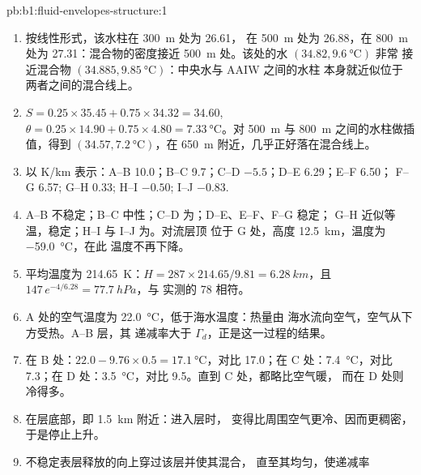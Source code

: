 \begin{solution}{pb:b1:fluid-envelopes-structure:1}
\begin{enumerate}
        为 26.888，比其平均值大 \qty{0.14}{kg.m^{-3}}。这就是混合增密效应。
  \item 按线性形式，该水柱在 \qty{300}{m} 处为 26.61，
        在 \qty{500}{m} 处为 26.88，在 \qty{800}{m} 处为 27.31：混合物的密度接近
        \qty{500}{m} 处。该处的水 $(34.82, \qty{9.6}{\celsius})$ 非常
        接近混合物 $(34.885, \qty{9.85}{\celsius})$：中央水与 AAIW 之间的水柱
        本身就近似位于
        两者之间的混合线上。
  \item $S = 0.25 \times 35.45 + 0.75 \times 34.32 = 34.60$, $\theta = 0.25
        \times 14.90 + 0.75 \times 4.80 = \qty{7.33}{\celsius}$。对
        \qty{500}{m} 与 \qty{800}{m} 之间的水柱做插值，得到
        $(34.57, \qty{7.2}{\celsius})$，在 \qty{650}{m} 附近，几乎正好落在混合线上。
  \item 以 \si{K/km} 表示：A--B 10.0；B--C 9.7；C--D $-5.5$；D--E 6.29；E--F 6.50；
        F--G 6.57; G--H 0.33; H--I $-0.50$; I--J $-0.83$.
  \item A--B 不稳定；B--C 中性；C--D 为；D--E、E--F、F--G 稳定；
        G--H 近似等温，稳定；H--I 与 I--J 为。对流层顶
        位于 G 处，高度 \qty{12.5}{km}，温度为 \qty{-59.0}{\celsius}，在此
        温度不再下降。
  \item 平均温度为 \qty{214.65}{K}：$H = 287 \times 214.65/9.81 =
        \qty{6.28}{km}$，且 $147\,e^{-4/6.28} = \qty{77.7}{hPa}$，与
        实测的 78 相符。
  \item A 处的空气温度为 \qty{22.0}{\celsius}，低于海水温度：热量由
        海水流向空气，空气从下方受热。A--B 层，其
        递减率大于 $\Gamma_d$，正是这一过程的结果。
  \item 在 B 处：$22.0 - 9.76 \times 0.5 = \qty{17.1}{\celsius}$，对比 17.0；在
        C 处：\qty{7.4}{\celsius}，对比 7.3；在 D 处：\qty{3.5}{\celsius}，对比
        9.5。直到 C 处，都略比空气暖，
        而在 D 处则冷得多。
  \item 在层底部，即 \qty{1.5}{km} 附近：进入层时，
        变得比周围空气更冷、因而更稠密，
        于是停止上升。
  \item 不稳定表层释放的向上穿过该层并使其混合，
        直至其均匀，使递减率

\end{enumerate}
\end{solution}
